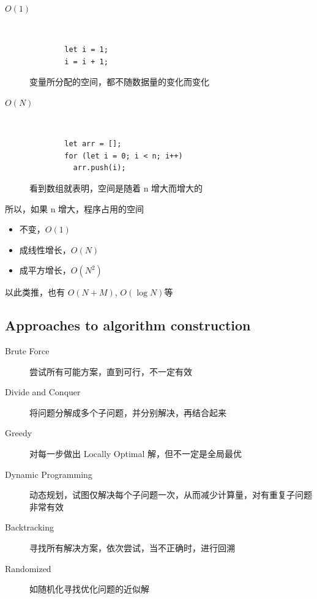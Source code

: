 \documentclass[11pt,journal,compsoc]{IEEEtran}
\begin{document}
\begin{description}
    \item[$O(1)$] ~

    \begin{verbatim}
        let i = 1;
        i = i + 1;
    \end{verbatim}

    变量所分配的空间，都不随数据量的变化而变化

    \item[$O(N)$] ~

    \begin{verbatim}
        let arr = [];
        for (let i = 0; i < n; i++)
          arr.push(i);
    \end{verbatim}

    看到数组就表明，空间是随着 n 增大而增大的
\end{description}

所以，如果 n 增大，程序占用的空间

\begin{itemize}
    \item 不变，$O(1)$

    \item 成线性增长，$O(N)$

    \item 成平方增长，$O(N^2)$
\end{itemize}

以此类推，也有 $O(N + M)$, $O(\log N)$等


\subsection{Approaches to algorithm construction}

\begin{description}
    \item[Brute Force] 尝试所有可能方案，直到可行，不一定有效

    \item[Divide and Conquer] 将问题分解成多个子问题，并分别解决，再结合起来

    \item[Greedy] 对每一步做出 Locally Optimal 解，但不一定是全局最优

    \item[Dynamic Programming] 动态规划，试图仅解决每个子问题一次，从而减少计算量，对有重复子问题非常有效

    \item[Backtracking] 寻找所有解决方案，依次尝试，当不正确时，进行回溯

    \item[Randomized] 如随机化寻找优化问题的近似解
\end{description}
\end{document}
